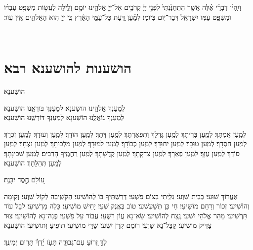 \documentclass[twoside, openany, parskip=half, 11pt]{book}
\begin{document}
וְיִֽהְי֨וּ דְבָרַ֜י אֵ֗לֶּה אֲשֶׁ֤ר הִתְחַנַּ֙נְתִּי֙ לִפְנֵ֣י יְיָ֔ קְרֹבִ֛ים אֶל־יְיָ֥ אֱלֹהֵ֖ינוּ יוֹמָ֣ם וָלָ֑יְלָה לַעֲשׂ֣וֹת מִשְׁפַּ֣ט עַבְדּ֗וֹ וּמִשְׁפַּ֛ט עַמּ֥וֹ יִשְׂרָאֵ֖ל דְּבַר־י֥וֹם בְּיוֹמֽוֹ׃ לְמַ֗עַן דַּ֚עַת כָּל־עַמֵּ֣י הָאָ֔רֶץ כִּ֥י יְיָ֖ ה֣וּא הָאֱלֹהִ֑ים אֵ֖ין עֽוֹד׃

\vfill
{}\\

\clearpage

\vspace{-1\baselineskip}
\section[הושענות להושענא רבא]{ הושענות להושענא רבא }

\begin{Large}
הוֹשַׁענָא׃
\end{Large}


לְמַעַנְךָ אֱלֹהֵֽינוּ הוֹשַׁענָא׃ לְמַעַנְךָ בּוֹרְאֵֽנוּ הוֹשַׁענָא׃\\
לְמַעַנְךָ גּוֹאֲלֵֽנוּ הוֹשַׁענָא׃ לְמַעַנְךָ דּוֹרְשֵֽׁנוּ הוֹשַׁענָא׃

לְמַֽעַן אֲמִתָּךְ׃ לְמַֽעַן בְּרִיתָךְ׃ לְמַֽעַן גָּדְלָךְ וְתִפְאַרְתָּךְ׃ לְמַֽעַן דָּתָךְ׃ לְמַֽעַן הוֹדָךְ׃ לְמַֽעַן וִעוּדָךְ׃ לְמַֽעַן זִכְרָךְ׃ לְמַֽעַן חַסְדָּךְ׃ לְמַֽעַן טוּבָךְ׃ לְמַֽעַן יִחוּדָךְ׃ לְמַֽעַן כְּבוֹדָךְ׃ לְמַֽעַן לִמּוּדָךְ׃ לְמַֽעַן מַלְכוּתָךְ׃ לְמַֽעַן נִצְחָךְ׃ לְמַֽעַן סוֹדָךְ׃ לְמַֽעַן עֻזָּךְ׃ לְמַֽעַן פְּאֵרָךְ׃ לְמַֽעַן צִדְקָתָךְ׃ לְמַֽעַן קְדֻשָּׁתָךְ׃ לְמַֽעַן רַחֲמֶֽיךָ הָרַבִּים׃
לְמַֽעַן שְׁכִינָתָךְ׃
לְמַֽעַן תְּהִלָּתָךְ׃ הוֹשַׁענָא׃

ע֭וֹלָם חֶ֣סֶד יִבָּנֶ֑ה׃

אֶעֱרוֹךְ שׁוּעִי׃ בְּבֵית שַׁוְעִי׃ גִּלִּֽיתִי בַצּוֹם פִּשְׁעִי׃ דְּרַשְׁתִּֽיךָ בּוֹ לְהוֹשִׁיעִי׃ הַקְשִֽׁיבָה לְקוֹל שַׁוְעִי׃ וְקֽוּמָה וְהוֹשִׁיעִי׃ זְכוֹר וְרַחֵם מוֹשִׁיעִי׃ חַי כֵּן תְּשַׁעְשְׁעִי׃ טוֹב בְּאֶֽנֶק שְׁעִי׃ יָחִישׁ מוֹשִׁיעִי׃ כַּלֵּה מַרְשִׁיעִי׃ לְבַל עוֹד תַּרְשִׁיעִי׃ מַהֵר אֱלֹהֵי יִשְׁעִי׃ נֶֽצַח לְהוֹשִׁיעִי׃ שָׂא־נָא עֲוֹן רִשְׁעִי׃ עֲבוֹר עַל פִּשְׁעִי׃ פְּנֵה־נָא לְהוֹשִׁיעִי׃ צוּר צַדִּיק מוֹשִׁיעִי׃ קַבֵּל־נָא שַׁוְעִי׃ רוֹמֵם קֶֽרֶן יִשְׁעִי׃
שַׁדַּי מוֹשִׁיעִי׃
תּוֹפִֽיעַ וְתוֹשִׁיעִי׃ הוֹשַׁענָא׃

לְךָ֣ זְ֭רוֹעַ עִם־גְּבוּרָ֑ה תָּעֹ֥ז יָ֝דְךָ֗ תָּר֥וּם יְמִינֶֽךָ׃


\end{document}
